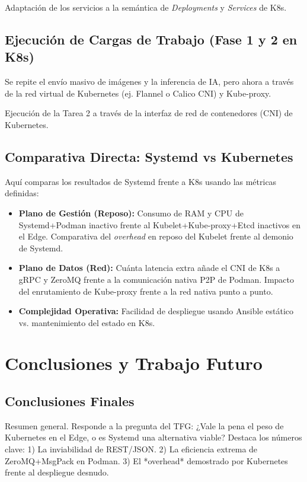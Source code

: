\documentclass[11pt, a4paper]{report}
\begin{document}
Adaptación de los servicios a la semántica de \textit{Deployments} y \textit{Services} de K8s.

\section{Ejecución de Cargas de Trabajo (Fase 1 y 2 en K8s)}
Se repite el envío masivo de imágenes y la inferencia de IA, pero ahora a través de la red virtual de Kubernetes (ej. Flannel o Calico CNI) y Kube-proxy.

Ejecución de la Tarea 2 a través de la interfaz de red de contenedores (CNI) de Kubernetes.

\section{Comparativa Directa: Systemd vs Kubernetes}
Aquí comparas los resultados de Systemd frente a K8s usando las métricas definidas:
\begin{itemize}
    \item \textbf{Plano de Gestión (Reposo):} Consumo de RAM y CPU de Systemd+Podman inactivo frente al Kubelet+Kube-proxy+Etcd inactivos en el Edge. Comparativa del \textit{overhead} en reposo del Kubelet frente al demonio de Systemd.
    \item \textbf{Plano de Datos (Red):} Cuánta latencia extra añade el CNI de K8s a gRPC y ZeroMQ frente a la comunicación nativa P2P de Podman. Impacto del enrutamiento de Kube-proxy frente a la red nativa punto a punto.
    \item \textbf{Complejidad Operativa:} Facilidad de despliegue usando Ansible estático vs. mantenimiento del estado en K8s.
\end{itemize}

\chapter{Conclusiones y Trabajo Futuro}

\section{Conclusiones Finales}
Resumen general. Responde a la pregunta del TFG: ¿Vale la pena el peso de Kubernetes en el Edge, o es Systemd una alternativa viable? 
Destaca los números clave: 
1) La inviabilidad de REST/JSON. 
2) La eficiencia extrema de ZeroMQ+MsgPack en Podman. 
3) El *overhead* demostrado por Kubernetes frente al despliegue desnudo.
\end{document}
